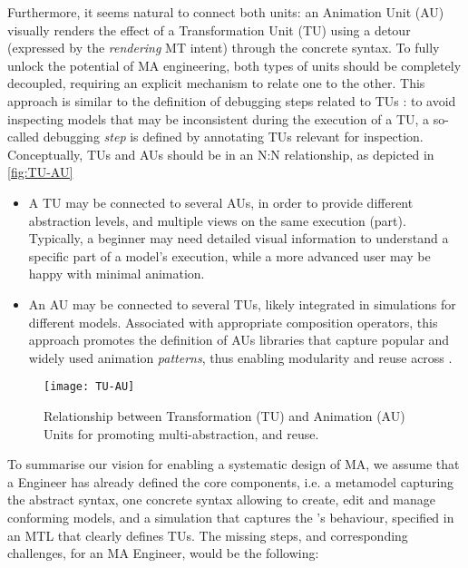 Furthermore, it seems natural to connect both units: an Animation Unit (AU) visually
renders the effect of a Transformation Unit (TU) using a detour (expressed by the
\emph{rendering} MT intent) through the concrete syntax. To fully unlock the 
potential of MA engineering, both types of units should be completely decoupled,
requiring an explicit mechanism to relate one to the other. This approach is similar
to the definition of debugging steps related to TUs 
\cite{bousse2018omniscient,J:VanMierlo-Vangheluwe-etAl:2020}: to avoid inspecting
models that may be inconsistent during the execution of a TU, a so-called debugging
\emph{step} is defined by annotating TUs relevant for inspection. 
Conceptually, TUs and AUs should be in an \textsf{N:N} relationship, as depicted
in \autoref{fig:TU-AU}
\begin{itemize}
	\item A TU may be connected to several AUs, in order to provide different abstraction
   levels, and multiple views on the same execution (part). Typically, a beginner
   may need detailed visual information to understand a specific part of a model's
   execution, while a more advanced user may be happy with minimal animation.

   \item An AU may be connected to several TUs, likely integrated in simulations
   for different models. Associated with appropriate composition operators, this
   approach promotes the definition of AUs libraries that capture popular and 
   widely used animation \emph{patterns}, thus enabling modularity and reuse 
   across \DSLs.
\end{itemize}

\begin{figure}[t]%
   \texttt{[image: TU-AU]}%
   \caption{Relationship between Transformation (TU) and Animation (AU) Units for
   promoting multi-abstraction, and reuse.}%
   \label{fig:TU-AU}%
\end{figure}

To summarise our vision for enabling a systematic design of MA, we assume that a 
\DSL Engineer has already defined the core components, i.e. a metamodel capturing
the abstract syntax, one concrete syntax allowing to create, edit and manage 
conforming models, and a simulation that captures the \DSL's behaviour, specified
in an MTL that clearly defines TUs. The missing steps, and corresponding challenges,
for an MA Engineer, would be the following:

